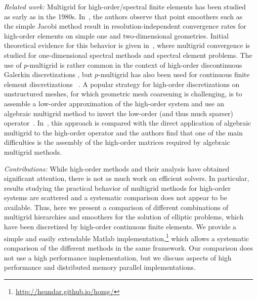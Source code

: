 \documentclass[smallcondensed,final]{svjour3}     %
\newcommand{\todo}[1]{\textcolor{red}{ #1}}
\newcommand{\gsnote}[1]{\textcolor{blue}{GS: #1}}
\begin{document}
{\em Related work:} Multigrid for high-order/spectral finite elements
has been studied as early as in the 1980s. In~\cite{RonquistPatera87},
the authors observe that point smoothers such as the simple Jacobi
method result in resolution-independent convergence rates for
high-order elements on simple one and two-dimensional
geometries. Initial theoretical evidence for this behavior is given
in~\cite{MadayMunoz88}, where multigrid convergence is studied for
one-dimensional spectral methods and spectral element problems.
%
The use of $p$-multigrid is rather common in the context of
high-order discontinuous Galerkin discretizations
\cite{FidkowskiOliverLuEtAl05, HelenbrookAtkins06}, but $p$-multigrid
has also been used for continuous finite element discretizations ~\cite{HelenbrookMavriplisAtkins03}.
%
%
%
%
A popular strategy for high-order discretizations on unstructured
meshes, for which geometric mesh coarsening is
challenging, is to assemble a low-order approximation of the
high-order system and use an algebraic multigrid method to invert the
low-order (and thus much sparser) operator~\cite{Brown10, Kim07,
  DevilleMund90, Olson07, CanutoGervasioQuarteroni10}.
In~\cite{HeysManteuffelMcCormickEtAl05}, this approach is compared
with the direct application of algebraic multigrid to the high-order
operator and the authors find that one of the main difficulties is the
assembly of the high-order matrices required by algebraic multigrid
methods.



{\em Contributions:} While high-order methods and their analysis have
obtained significant attention, there is not as much work on efficient solvers.
In
particular, results studying the practical behavior of multigrid
methods for high-order systems are scattered and a systematic
comparison does not appear to be available.  Thus, here we present a
comparison of different combinations of multigrid hierarchies and
smoothers for the solution of elliptic problems, which have been
discretized by high-order continuous finite elements.  We provide a
simple and easily extendable Matlab implementation,\footnote{\url{http://hsundar.github.io/homg/}} which allows a systematic
comparison of the different methods in the same framework. Our
comparison does
not use a high performance implementation, but we discuss aspects of
high performance and distributed memory parallel implementations.
\end{document}
